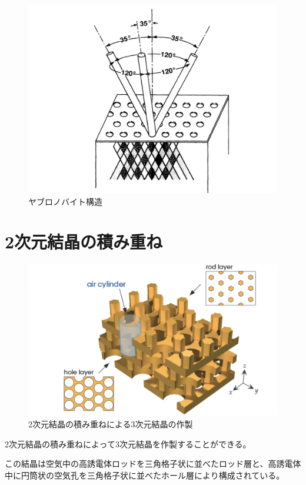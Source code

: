 \documentclass[platex,dvipdfmx,draft]{jsreport}
\numberwithin{equation}{section}
\begin{document}
\begin{figure}[htbp]
  \centering
  \includegraphics[width=0.6\linewidth]{yablonovite.png}
  \caption{ヤブロノバイト構造}
  \label{fig:yablonovite}

\end{figure}


\section{2次元結晶の積み重ね}
\begin{figure}[htbp]
  \centering
  \includegraphics[width=0.6\linewidth]{2d.png}
  \caption{2次元結晶の積み重ねによる3次元結晶の作製}
  \label{fig:2d_3d}
\end{figure}
2次元結晶の積み重ねによって3次元結晶を作製することができる。

この結晶は空気中の高誘電体ロッドを三角格子状に並べたロッド層と、高誘電体中に円筒状の空気孔を三角格子状に並べたホール層により構成されている。
\end{document}
